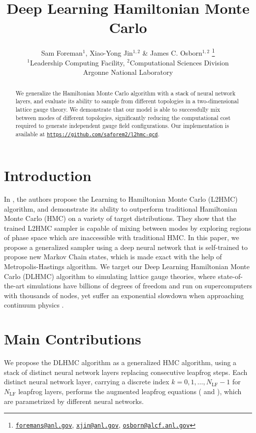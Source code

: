\documentclass{article} %
\title{Deep Learning Hamiltonian Monte Carlo}
\author{Sam Foreman\(^{1}\), Xiao-Yong Jin\(^{1,2}\) \& James C. Osborn\(^{1,2}\)
\thanks{
   \texttt{\href{mailto:foremans@anl.gov}{foremans@anl.gov}},
   \texttt{\href{mailto:xjin@anl.gov}{xjin@anl.gov}},
   \texttt{\href{mailto:osborn@alcf.anl.gov}{osborn@alcf.anl.gov}}
}\\
   \(^{1}\)Leadership Computing Facility, \(^{2}\)Computational Sciences Division\\
   Argonne National Laboratory\\
}
\begin{document}
\maketitle
\begin{abstract}
   We generalize the Hamiltonian Monte Carlo algorithm with a stack of neural network layers,
   and evaluate its ability to sample from
   different topologies in a two-dimensional lattice gauge theory.
   We demonstrate that our model is able to successfully mix between modes of different topologies,
   significantly reducing the computational cost required to generate independent gauge field configurations.
   Our implementation is available at
   \texttt{\href{https://github.com/saforem2/lh2mc-qcd}{https://github.com/saforem2/l2hmc-qcd}}.
\end{abstract}

\section{\label{sec:introduction}Introduction}
In \citet{levy2017}, the authors propose the Learning to Hamiltonian Monte Carlo (L2HMC) algorithm, and demonstrate
its ability to outperform traditional Hamiltonian Monte Carlo (HMC) on a variety of %
target
distributions.
%
They show that the trained L2HMC sampler is capable of mixing between modes by exploring regions of phase space which are %
inaccessible with traditional HMC.\@
%
In this paper, we propose a generalized sampler using a deep neural network that is
self-trained to propose new Markov Chain states,
which is made exact with the help of Metropolis-Hastings \citep{zbMATH03349185} algorithm.
We target our Deep Learning Hamiltonian Monte Carlo (DLHMC) algorithm to simulating lattice gauge theories,
where state-of-the-art simulations have billions of degrees of freedom and run on supercomputers with thousands of nodes,
yet suffer an exponential slowdown when approaching continuum physics \citep{schaefer2009investigating,cossu2018testing}.

\section{\label{sec:maincontributions}Main Contributions}
We propose the DLHMC algorithm as a generalized HMC algorithm, using a stack of distinct neural network layers replacing
consecutive leapfrog steps.
%
Each distinct neural network layer, carrying a discrete index \(k = 0, 1, \ldots, N_{\mathrm{LF}}-1\) for
$N_{\mathrm{LF}}$ leapfrog layers, performs the augmented leapfrog equations ( and
), which are parametrized by different neural networks.
%
\end{document}
